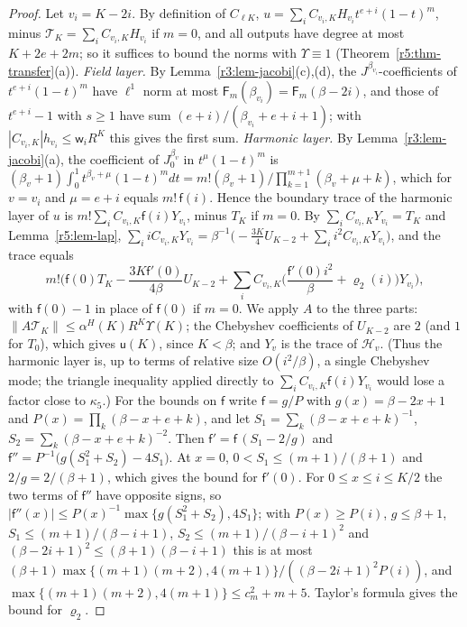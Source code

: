 \documentclass[11pt]{amsart}
\theoremstyle{definition}
\theoremstyle{remark}
\numberwithin{equation}{section}
\newcommand{\nrm}[1]{\lVert #1\rVert}
\begin{document}
\begin{proof}
Let $v_i=K-2i$. By definition of $C_{\ell K}$, $u=\sum_iC_{v_i,K}H_{v_i}t^{e+i}(1-t)^m$, minus $\mathcal T_K=\sum_iC_{v_i,K}H_{v_i}$ if $m=0$, and all outputs have degree at most $K+2e+2m$; so it suffices to bound the norms with $\Upsilon\equiv1$ (Theorem~\ref{r5:thm-transfer}(a)). \emph{Field layer.} By Lemma~\ref{r3:lem-jacobi}(c),(d), the $J^{\beta_{v_i}}$-coefficients of $t^{e+i}(1-t)^m$ have $\ell^1$ norm at most $\mathsf F_m(\beta_{v_i})=\mathsf F_m(\beta-2i)$, and those of $t^{e+i}-1$ with $s\geq1$ have sum $(e+i)/(\beta_{v_i}+e+i+1)$; with $|C_{v_i,K}|h_{v_i}\leq\mathsf w_iR^K$ this gives the first sum. \emph{Harmonic layer.} By Lemma~\ref{r3:lem-jacobi}(a), the coefficient of $J^{\beta_v}_0$ in $t^\mu(1-t)^m$ is $(\beta_v+1)\int_0^1t^{\beta_v+\mu}(1-t)^mdt=m!(\beta_v+1)/\prod_{k=1}^{m+1}(\beta_v+\mu+k)$, which for $v=v_i$ and $\mu=e+i$ equals $m!\,\mathsf f(i)$. Hence the boundary trace of the harmonic layer of $u$ is $m!\sum_iC_{v_i,K}\mathsf f(i)Y_{v_i}$, minus $T_K$ if $m=0$. By $\sum_iC_{v_i,K}Y_{v_i}=T_K$ and Lemma~\ref{r5:lem-lap}, $\sum_iiC_{v_i,K}Y_{v_i}=\beta^{-1}\big(-\frac{3K}4U_{K-2}+\sum_ii^2C_{v_i,K}Y_{v_i}\big)$, and the trace equals
\[
m!\Big(\mathsf f(0)T_K-\frac{3K\mathsf f'(0)}{4\beta}U_{K-2}+\sum_iC_{v_i,K}\Big(\frac{\mathsf f'(0)i^2}\beta+\varrho_2(i)\Big)Y_{v_i}\Big),
\]
with $\mathsf f(0)-1$ in place of $\mathsf f(0)$ if $m=0$. We apply $A$ to the three parts: $\nrm{A\mathcal T_K}\leq\alpha^H(K)R^K\Upsilon(K)$; the Chebyshev coefficients of $U_{K-2}$ are $2$ (and $1$ for $T_0$), which gives $\mathsf u(K)$, since $K<\beta$; and $Y_{v}$ is the trace of $\mathcal H_v$. (Thus the harmonic layer is, up to terms of relative size $O(i^2/\beta)$, a single Chebyshev mode; the triangle inequality applied directly to $\sum_iC_{v_i,K}\mathsf f(i)Y_{v_i}$ would lose a factor close to $\kappa_5$.) For the bounds on $\mathsf f$ write $\mathsf f=g/P$ with $g(x)=\beta-2x+1$ and $P(x)=\prod_k(\beta-x+e+k)$, and let $S_1=\sum_k(\beta-x+e+k)^{-1}$, $S_2=\sum_k(\beta-x+e+k)^{-2}$. Then $\mathsf f'=\mathsf f\,(S_1-2/g)$ and $\mathsf f''=P^{-1}\big(g(S_1^2+S_2)-4S_1\big)$. At $x=0$, $0<S_1\leq(m+1)/(\beta+1)$ and $2/g=2/(\beta+1)$, which gives the bound for $\mathsf f'(0)$. For $0\leq x\leq i\leq K/2$ the two terms of $\mathsf f''$ have opposite signs, so $|\mathsf f''(x)|\leq P(x)^{-1}\max\{g(S_1^2+S_2),4S_1\}$; with $P(x)\geq P(i)$, $g\leq\beta+1$, $S_1\leq(m+1)/(\beta-i+1)$, $S_2\leq(m+1)/(\beta-i+1)^2$ and $(\beta-2i+1)^2\leq(\beta+1)(\beta-i+1)$ this is at most $(\beta+1)\max\{(m+1)(m+2),4(m+1)\}/((\beta-2i+1)^2P(i))$, and $\max\{(m+1)(m+2),4(m+1)\}\leq c_m^2+m+5$. Taylor's formula gives the bound for $\varrho_2$.
\end{proof}
\end{document}

